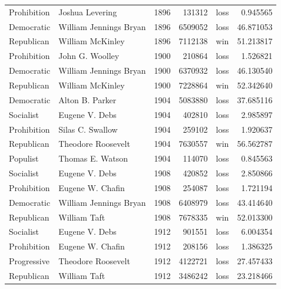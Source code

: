 \documentclass[
  letterpaper,
  DIV=11,
  numbers=noendperiod]{scrreprt}
\begin{document}
\begin{tabular}{llrrlr}
Prohibition           &         Joshua Levering &  1896 &        131312 &   loss &   0.945565 \\
Democratic            &  William Jennings Bryan &  1896 &       6509052 &   loss &  46.871053 \\
Republican            &        William McKinley &  1896 &       7112138 &    win &  51.213817 \\
Prohibition           &         John G. Woolley &  1900 &        210864 &   loss &   1.526821 \\
Democratic            &  William Jennings Bryan &  1900 &       6370932 &   loss &  46.130540 \\
Republican            &        William McKinley &  1900 &       7228864 &    win &  52.342640 \\
Democratic            &         Alton B. Parker &  1904 &       5083880 &   loss &  37.685116 \\
Socialist             &          Eugene V. Debs &  1904 &        402810 &   loss &   2.985897 \\
Prohibition           &        Silas C. Swallow &  1904 &        259102 &   loss &   1.920637 \\
Republican            &      Theodore Roosevelt &  1904 &       7630557 &    win &  56.562787 \\
Populist              &        Thomas E. Watson &  1904 &        114070 &   loss &   0.845563 \\
Socialist             &          Eugene V. Debs &  1908 &        420852 &   loss &   2.850866 \\
Prohibition           &        Eugene W. Chafin &  1908 &        254087 &   loss &   1.721194 \\
Democratic            &  William Jennings Bryan &  1908 &       6408979 &   loss &  43.414640 \\
Republican            &            William Taft &  1908 &       7678335 &    win &  52.013300 \\
Socialist             &          Eugene V. Debs &  1912 &        901551 &   loss &   6.004354 \\
Prohibition           &        Eugene W. Chafin &  1912 &        208156 &   loss &   1.386325 \\
Progressive           &      Theodore Roosevelt &  1912 &       4122721 &   loss &  27.457433 \\
Republican            &            William Taft &  1912 &       3486242 &   loss &  23.218466 \\

\end{tabular}
\end{document}
